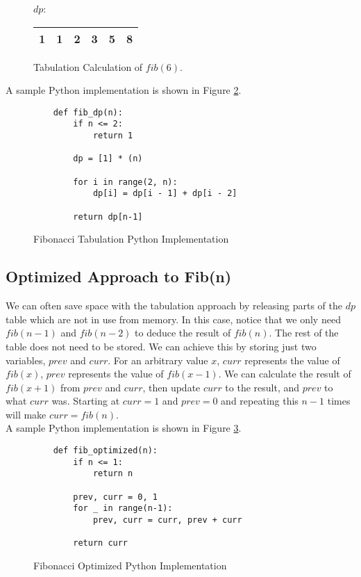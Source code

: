 \begin{figure}[H]
    \centering
    $dp$:
    \begin{table}[H]
        \centering
        \begin{tabular}{|c|c|c|c|c|c|}
            \hline
            1 & 1 & 2 & 3 & 5 & 8 \\
            \hline
        \end{tabular}
    \end{table}
    \caption{Tabulation Calculation of $fib(6)$.}
    \label{fig:fibonacci-dp-table}
\end{figure}

A sample Python implementation is shown in Figure \ref{fig:fibonacci-dp}.

\begin{figure}[H]
    \centering
    \begin{lstlisting}
    def fib_dp(n):
        if n <= 2:
            return 1

        dp = [1] * (n)

        for i in range(2, n):
            dp[i] = dp[i - 1] + dp[i - 2]

        return dp[n-1]
    \end{lstlisting}
    \caption{Fibonacci Tabulation Python Implementation}
    \label{fig:fibonacci-dp}
\end{figure}
\newpage

\subsection{Optimized Approach to Fib(n)}
We can often save space with the tabulation
approach by releasing parts of the $dp$ table which are not in use from memory.
In this case, notice that we only need $fib(n-1)$ and $fib(n-2)$ to deduce the result of $fib(n)$.
The rest of the table does not need to be stored. 
We can achieve this by storing just two variables, $prev$ and $curr$.
For an arbitrary value $x$, $curr$ represents the value of $fib(x)$, $prev$ represents the value of $fib(x-1)$.
We can calculate the result of $fib(x+1)$ from $prev$ and $curr$, then update $curr$ to the result, and $prev$ to what $curr$ was.
Starting at $curr=1$ and $prev=0$ and repeating this $n-1$ times will make $curr = fib(n)$.\\

A sample Python implementation is shown in Figure \ref{fig:fibonacci-optimized}.
\begin{figure}[H]
    \centering
    \begin{lstlisting}
    def fib_optimized(n):
        if n <= 1:
            return n
        
        prev, curr = 0, 1
        for _ in range(n-1):
            prev, curr = curr, prev + curr
            
        return curr
    \end{lstlisting}
    \caption{Fibonacci Optimized Python Implementation}
    \label{fig:fibonacci-optimized}
\end{figure}

